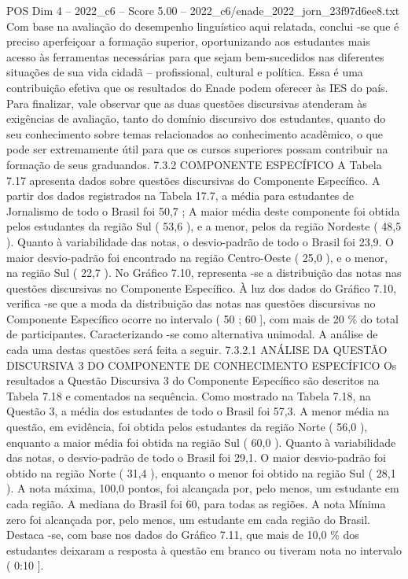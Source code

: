 \begin{textsample}{POS Dim 4 – 2022\_c6 – Score 5.00 – 2022\_c6/enade\_2022\_jorn\_23f97d6ee8.txt}
Com base na avaliação do desempenho linguístico aqui relatada, conclui -se que é preciso aperfeiçoar a formação superior, oportunizando aos estudantes mais acesso às ferramentas necessárias para que sejam bem-sucedidos nas diferentes situações de sua vida cidadã – profissional, cultural e política.
Essa é uma contribuição efetiva que os resultados do Enade podem oferecer às IES do país.
Para finalizar, vale observar que as duas questões discursivas atenderam às exigências de avaliação, tanto do domínio discursivo dos estudantes, quanto do seu conhecimento sobre temas relacionados ao conhecimento acadêmico, o que pode ser extremamente útil para que os cursos superiores possam contribuir na formação de seus graduandos. 7.3.2 COMPONENTE ESPECÍFICO A Tabela 7.17 apresenta dados sobre questões discursivas do Componente Específico.
A partir dos dados registrados na Tabela 17.7, a média para estudantes de Jornalismo de todo o Brasil foi 50,7 ; A maior média deste componente foi obtida pelos estudantes da região Sul ( 53,6 ), e a menor, pelos da região Nordeste ( 48,5 ).
Quanto à variabilidade das notas, o desvio-padrão de todo o Brasil foi 23,9.
O maior desvio-padrão foi encontrado na região Centro-Oeste ( 25,0 ), e o menor, na região Sul ( 22,7 ).
No Gráfico 7.10, representa -se a distribuição das notas nas questões discursivas no Componente Específico.
À luz dos dados do Gráfico 7.10, verifica -se que a moda da distribuição das notas nas questões discursivas no Componente Específico ocorre no intervalo ( 50 ; 60 ], com mais de 20 \% do total de participantes.
Caracterizando -se como alternativa unimodal.
A análise de cada uma destas questões será feita a seguir. 7.3.2.1 ANÁLISE DA QUESTÃO DISCURSIVA 3 DO COMPONENTE DE CONHECIMENTO ESPECÍFICO Os resultados a Questão Discursiva 3 do Componente Específico são descritos na Tabela 7.18 e comentados na sequência.
Como mostrado na Tabela 7.18, na Questão 3, a média dos estudantes de todo o Brasil foi 57,3.
A menor média na questão, em evidência, foi obtida pelos estudantes da região Norte ( 56,0 ), enquanto a maior média foi obtida na região Sul ( 60,0 ).
Quanto à variabilidade das notas, o desvio-padrão de todo o Brasil foi 29,1.
O maior desvio-padrão foi obtido na região Norte ( 31,4 ), enquanto o menor foi obtido na região Sul ( 28,1 ).
A nota máxima, 100,0 pontos, foi alcançada por, pelo menos, um estudante em cada região.
A mediana do Brasil foi 60, para todas as regiões.
A nota Mínima zero foi alcançada por, pelo menos, um estudante em cada região do Brasil.
Destaca -se, com base nos dados do Gráfico 7.11, que mais de 10,0 \% dos estudantes deixaram a resposta à questão em branco ou tiveram nota no intervalo ( 0:10 ].

\end{textsample}

